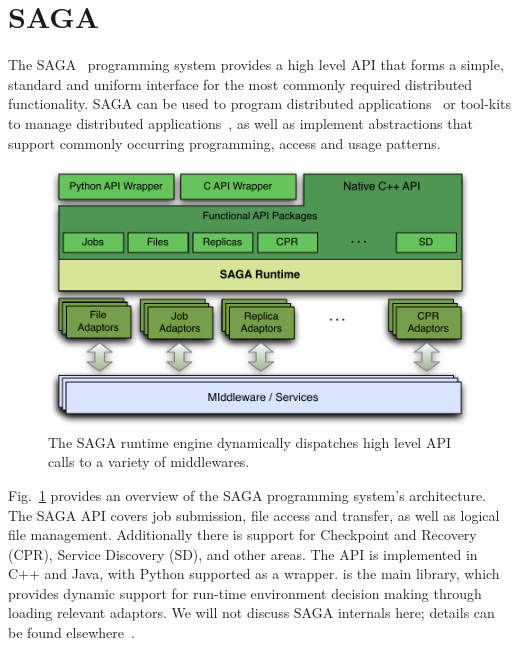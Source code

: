 \documentclass[3p,twocolumn]{elsarticle}
\begin{document}



\section{SAGA}
\label{sec:saga}

The SAGA~\cite{saga-core, Kaiser:2006qp} programming system provides a
high level API that forms a simple, standard and uniform interface for
the most commonly required distributed functionality.  SAGA can be
used to program distributed applications~\cite{saga_escience07,
saga_tg08} or tool-kits to manage distributed
applications~\cite{Luckow:2008xy}, as well as implement abstractions
that support commonly occurring programming, access and usage
patterns.

\begin{figure}[t]
 \dnnn
 \includegraphics[scale=0.5]{saga-figure02.pdf}
 \caption{The SAGA runtime engine dynamically dispatches high level
          API calls to a variety of middlewares.}
 \label{fig:saga}
\end{figure}

Fig.~\ref{fig:saga} provides an overview of the SAGA programming
system's architecture.  The SAGA API covers job submission, file
access and transfer, as well as logical file management.  Additionally
there is support for Checkpoint and Recovery (CPR), Service Discovery
(SD), and other areas.  The API is implemented in C++ and Java, with
Python supported as a wrapper.  is the main library,
which provides dynamic support for run-time environment decision
making through loading relevant adaptors. We will not discuss SAGA
internals here; details can be found elsewhere~\cite{saga_url,Kaiser:2006qp}.
\end{document}
